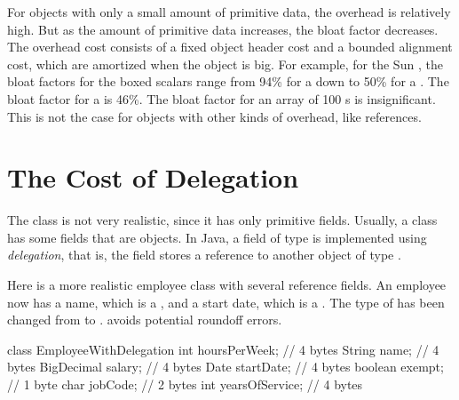 
For objects with only a small amount of primitive data, the overhead is relatively high. 
But as the amount of primitive data increases, the bloat factor decreases. 
The overhead cost consists of a fixed object header cost and a bounded alignment cost, which are amortized when the object is big.  For example, for the Sun \jre, the bloat factors for the boxed
scalars range from 94\% for a  down to 50\% for a
.  The bloat factor for a  is 46\%.  The
bloat factor for an array of 100 s is insignificant. This is not the
case for objects with other kinds of overhead, like references.

\section{The Cost of Delegation}

The  class is not very realistic, since it has only
primitive fields. Usually, a class has some fields that are objects. In Java,
a field of type  is implemented using \textit{delegation},
that is, the field stores a reference to another object of type
. 

Here is a more realistic employee class with several reference fields. An
employee now has a name, which is a , and a start date, which is a
. The type of  has been changed from 
to .  avoids potential roundoff errors.
\begin{shortlisting} 
class EmployeeWithDelegation {
    int hoursPerWeek;           // 4 bytes
    String name;                // 4 bytes
    BigDecimal salary;          // 4 bytes
    Date startDate;             // 4 bytes
    boolean exempt;             // 1 byte
    char jobCode;               // 2 bytes
    int yearsOfService;         // 4 bytes
}
\end{shortlisting}

